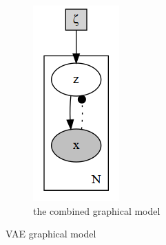\documentclass[final]{beamer}
\begin{document}
\begin{frame}
\begin{figure}[h]
\begin{subfigure}[b]{0.2\textwidth}
\includegraphics[width=\textwidth]{plots/vae.gv.png}
\caption{the combined graphical model}
\end{subfigure}
\caption{VAE graphical model}
\label{fig:vae_model}
\end{figure}

\end{frame}
\end{document}
